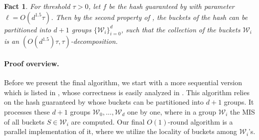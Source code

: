 \documentclass[11pt,letterpaper]{article}
\theoremstyle{plain}
\newtheorem{fact}[theorem]{Fact}
\theoremstyle{definition}
\theoremstyle{remark}
\begin{document}
\begin{fact}
    \label{fact:partition}
    For threshold $\tau > 0$, let $f$ be the hash guaranteed by  with parameter $\ell = O(d^{1.5}\tau)$.
    Then by the second property of ,
    the buckets of the hash can be partitioned into $d + 1$ groups $\{\mathcal{W}_i\}_{i=0}^d$, 
    such that the collection of the buckets $\mathcal{W}_i$ is an $(O(d^{1.5})\tau, \tau)$-decomposition.
\end{fact}






















\paragraph{Proof overview.} 
Before we present the final algorithm, we start with a more sequential version which is listed in , whose correctness is easily analyzed in . 
This algorithm relies on the hash guaranteed by  whose buckets can be partitioned into $d + 1$ groups.
It processes these $d + 1$ groups $\mathcal{W}_0, \ldots, \mathcal{W}_d$ one by one, where in a group $\mathcal{W}_i$ the MIS of all buckets $S \in \mathcal{W}_i$ are computed.
Our final $O(1)$-round algorithm is a parallel implementation of it, where we utilize the locality of buckets among $\mathcal{W}_i$'s.
\end{document}
